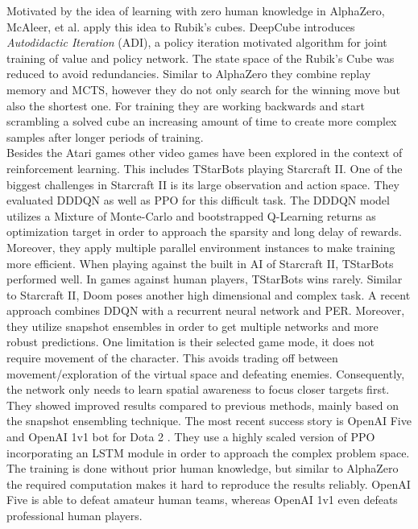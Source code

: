     Motivated by the idea of learning with zero human knowledge in AlphaZero, McAleer, et al. \cite{McAleer2018} apply this idea to Rubik's cubes. 
    DeepCube introduces \textit{Autodidactic Iteration} (ADI), a policy iteration motivated algorithm for joint training of value and policy network.
    The state space of the Rubik's Cube was reduced to avoid redundancies.
    Similar to AlphaZero they combine replay memory and MCTS, however they do not only search for the winning move but also the shortest one.
    For training they are working backwards and start scrambling a solved cube an increasing amount of time to create more complex samples after longer periods of training.\\
    Besides the Atari games other video games have been explored in the context of reinforcement learning. 
    This includes TStarBots \cite{Sun2018} playing Starcraft II.
    One of the biggest challenges in Starcraft II is its large observation and action space.
    They evaluated DDDQN as well as PPO for this difficult task.
    The DDDQN model utilizes a Mixture of Monte-Carlo and bootstrapped Q-Learning returns as optimization target in order to approach the sparsity and long delay of rewards.
    Moreover, they apply multiple parallel environment instances to make training more efficient. 
    When playing against the built in AI of Starcraft II, TStarBots performed well.
    In games against human players, TStarBots wins rarely.
    Similar to Starcraft II, Doom poses another high dimensional and complex task.
   	A recent approach \cite{Schulze2018} combines DDQN with a recurrent neural network and PER.
    Moreover, they utilize snapshot ensembles in order to get multiple networks and more robust predictions.
    One limitation is their selected game mode, it does not require movement of the character.
    This avoids trading off between movement/exploration of the virtual space and defeating enemies. 
    Consequently, the network only needs to learn spatial awareness to focus closer targets first. 
    They showed improved results compared to previous methods, mainly based on the snapshot ensembling technique.
    The most recent success story is OpenAI Five and OpenAI 1v1 bot for Dota 2 \cite{OpenAI2018}.
    They use a highly scaled version of PPO incorporating an LSTM module in order to approach the complex problem space. 
    The training is done without prior human knowledge, but similar to AlphaZero the required computation makes it hard to reproduce the results reliably.
    OpenAI Five is able to defeat amateur human teams, whereas OpenAI 1v1 even defeats professional human players.  
    
